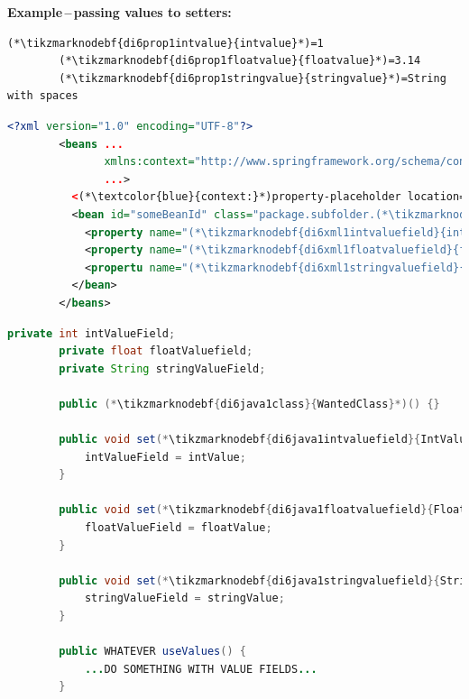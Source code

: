 \documentclass[12pt, dvipsnames, oneside, a4paper, titlepage, usenames]{report}
\begin{document}
    \noindent \textbf{Example\,--\,passing values to setters:}
    \begin{lstlisting}[title={A \textit{.properties} file called \tikzmarknodebf{di6prop1filename}{\textit{setters.properties}}}]
        (*\tikzmarknodebf{di6prop1intvalue}{intvalue}*)=1
        (*\tikzmarknodebf{di6prop1floatvalue}{floatvalue}*)=3.14
        (*\tikzmarknodebf{di6prop1stringvalue}{stringvalue}*)=String with spaces
    \end{lstlisting}
    \begin{lstlisting}[language=XML, title={Configuration XML}]
        <?xml version="1.0" encoding="UTF-8"?>
        <beans ...
               xmlns:context="http://www.springframework.org/schema/context"
               ...>
          <(*\textcolor{blue}{context:}*)property-placeholder location="classpath:(*\tikzmarknodebf{di6xml1filename}{setter.properties}[ForestGreen]*)"/>
          <bean id="someBeanId" class="package.subfolder.(*\tikzmarknodebf{di6xml1class}{WantedClass}[ForestGreen]*)">
            <property name="(*\tikzmarknodebf{di6xml1intvaluefield}{intValueField}[ForestGreen]*)" value="(*\textcolor{ForestGreen}{\$\{}\tikzmarknodebf{di6xml1intvalue}{intvalue}[ForestGreen]\textcolor{ForestGreen}{\}}*)"/>
            <property name="(*\tikzmarknodebf{di6xml1floatvaluefield}{floatValueField}[ForestGreen]*)" value="(*\textcolor{ForestGreen}{\$\{}\tikzmarknodebf{di6xml1floatvalue}{floatvalue}[ForestGreen]\textcolor{ForestGreen}{\}}*)"/>
            <propertu name="(*\tikzmarknodebf{di6xml1stringvaluefield}{stringValueField}[ForestGreen]*)" value="(*\textcolor{ForestGreen}{\$\{}\tikzmarknodebf{di6xml1stringvalue}{stringvalue}[ForestGreen]\textcolor{ForestGreen}{\}}*)"/>
          </bean>
        </beans>
    \end{lstlisting}
    \begin{lstlisting}[language=Java, title={Wanted class with the zero--parameter constructor and setter methods}]
        private int intValueField;
        private float floatValuefield;
        private String stringValueField;

        public (*\tikzmarknodebf{di6java1class}{WantedClass}*)() {}

        public void set(*\tikzmarknodebf{di6java1intvaluefield}{IntValueField}*)(int intValue) {
            intValueField = intValue;
        }

        public void set(*\tikzmarknodebf{di6java1floatvaluefield}{FloatValueField}*)(float floatValue) {
            floatValueField = floatValue;
        }

        public void set(*\tikzmarknodebf{di6java1stringvaluefield}{StringValueField}*)(string stringValue) {
            stringValueField = stringValue;
        }

        public WHATEVER useValues() {
            ...DO SOMETHING WITH VALUE FIELDS...
        }
    \end{lstlisting}
\end{document}
